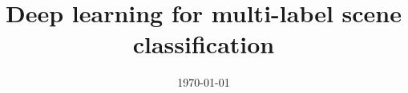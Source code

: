 \documentclass[a4paper, 11pt, oneside]{Thesis}  %
\begin{document}
\frontmatter	  %

\title  {Deep learning for multi-label scene classification}
\addresses  {\groupname\\\deptname\\\univname}  %
\date       {\today}
\subject    {}
\keywords   {}

\maketitle


\fancyhead{}  %
\rhead{\thepage}  %
\lhead{}  %

\pagestyle{fancy}  %
\end{document}
